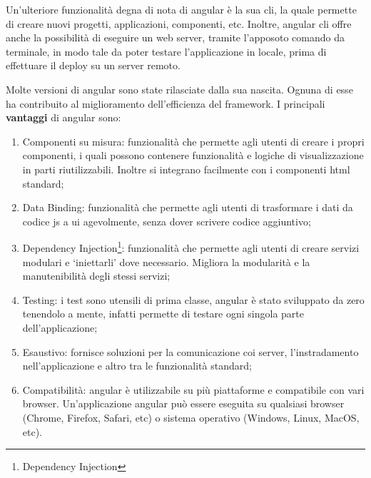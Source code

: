 Un'ulteriore funzionalità degna di nota di \gls{angular} è la sua \acrfull{cli}, la quale permette di creare nuovi progetti, applicazioni, componenti, etc. Inoltre, \gls{angular} \acrshort{cli} offre anche la possibilità di eseguire un web server, tramite l'apposoto comando da terminale, in modo tale da poter testare l'applicazione in locale, prima di effettuare il \gls{deploy} su un server remoto.\newline

Molte versioni di \gls{angular} sono state rilasciate dalla sua nascita. Ognuna di esse ha contribuito al miglioramento dell'efficienza del \gls{framework}.
I principali \textbf{vantaggi} di \gls{angular} sono:

\begin{enumerate}
    \item Componenti su misura: funzionalità che permette agli utenti di creare i propri componenti, i quali possono contenere funzionalità e logiche di visualizzazione in parti riutilizzabili. Inoltre si integrano facilmente con i componenti \acrshort{html} standard;
    \item Data Binding: funzionalità che permette agli utenti di trasformare i dati da codice \acrshort{js} a \acrshort{ui} agevolmente, senza dover scrivere codice aggiuntivo;
    \item Dependency Injection\footnote{\glsdesc{Dependency Injection}}: funzionalità che permette agli utenti di creare servizi modulari e `iniettarli' dove necessario. Migliora la modularità e la manutenibilità degli stessi servizi;
    \item Testing: i test sono utensili di prima classe, \gls{angular} è stato sviluppato da zero tenendolo a mente, infatti permette di testare ogni singola parte dell'applicazione;
    \item Esaustivo: fornisce soluzioni per la comunicazione coi server, l'instradamento nell'applicazione e altro tra le funzionalità standard;
    \item Compatibilità: \gls{angular} è utilizzabile su più piattaforme e compatibile con vari browser. Un'applicazione \gls{angular} può essere eseguita su qualsiasi browser (Chrome, Firefox, Safari, etc) o sistema operativo (Windows, Linux, MacOS, etc).
\end{enumerate}

